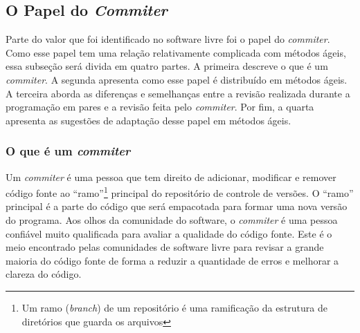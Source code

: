 \subsection{O Papel do \emph{Commiter}}
\label{subsec:commiter}

Parte do valor que foi identificado no software livre foi o papel do
\emph{commiter}. Como esse papel tem uma relação relativamente
complicada com métodos ágeis, essa subseção será divida em quatro
partes. A primeira descreve o que é um \emph{commiter}. A segunda
apresenta como esse papel é distribuído em métodos ágeis. A terceira
aborda as diferenças e semelhanças entre a revisão realizada durante a
programação em pares e a revisão feita pelo \emph{commiter}. Por fim,
a quarta apresenta as sugestões de adaptação desse papel em métodos
ágeis.

\subsubsection{O que é um \emph{commiter}}

Um \emph{commiter} é uma pessoa que tem direito de adicionar,
modificar e remover código fonte ao ``ramo''\footnote{Um ramo
  (\emph{branch}) de um repositório é uma ramificação da estrutura de
  diretórios que guarda os arquivos} principal do repositório de
controle de versões. O ``ramo'' principal é a parte do código que será
empacotada para formar uma nova versão do programa. Aos olhos da
comunidade do software, o \emph{commiter} é uma pessoa confiável muito
qualificada para avaliar a qualidade do código fonte. Este é o meio
encontrado pelas comunidades de software livre para revisar a grande
maioria do código fonte de forma a reduzir a quantidade de erros e
melhorar a clareza do código.

